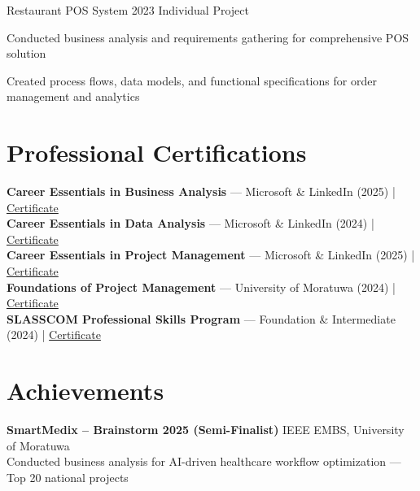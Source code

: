 \documentclass[letterpaper,10.8pt]{article}
\begin{document}
{Restaurant POS System}
{2023}
{Individual Project}{
  \item Conducted business analysis and requirements gathering for comprehensive POS solution
  \item Created process flows, data models, and functional specifications for order management and analytics
}

\section{Professional Certifications}
\vspace{-1pt}

\textbf{Career Essentials in Business Analysis} — Microsoft \& LinkedIn (2025) | \href{https://www.linkedin.com/posts/vindya-kodithuwakku-bb6187202_businessanalysis-careeressentials-microsoft-activity-7371193871919398914-PKak}{Certificate}\\[3pt]
\textbf{Career Essentials in Data Analysis} — Microsoft \& LinkedIn (2024) | \href{https://www.linkedin.com/posts/vindya-kodithuwakku-bb6187202_dataanalysis-careeressentials-microsoft-activity-7379124237950750720-kKmD}{Certificate}\\[3pt]
\textbf{Career Essentials in Project Management} — Microsoft \& LinkedIn (2025) | \href{https://www.linkedin.com/posts/vindya-kodithuwakku-bb6187202_projectmanagement-careeressentials-microsoft-activity-7374470702059438080-zbfj}{Certificate}\\[3pt]
\textbf{Foundations of Project Management} — University of Moratuwa (2024) | \href{https://open.uom.lk/lms/mod/customcert/verify_certificate.php?code=ATuxOYBBAE&qrcode=1}{Certificate}\\[3pt]
\textbf{SLASSCOM Professional Skills Program} — Foundation \& Intermediate (2024) | \href{https://www.linkedin.com/posts/vindya-kodithuwakku-bb6187202_slasscom-professionalskillsprogram-careerdevelopment-activity-7379038487246860288-PRA0}{Certificate}

\section{Achievements}
\vspace{-1pt}

\noindent\textbf{SmartMedix – Brainstorm 2025 (Semi-Finalist)} \hfill IEEE EMBS, University of Moratuwa\\
Conducted business analysis for AI-driven healthcare workflow optimization — Top 20 national projects
\end{document}
